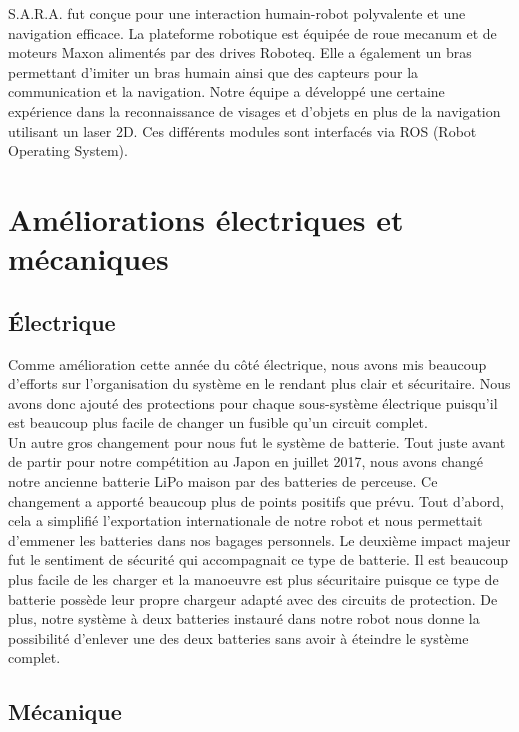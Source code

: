 \documentclass[runningheads,a4paper]{llncs}
\begin{document}
S.A.R.A. fut conçue pour une interaction humain-robot polyvalente et une navigation efficace. La plateforme robotique est équipée de roue mecanum et de moteurs Maxon alimentés par des drives Roboteq. Elle a également un bras permettant d'imiter un bras humain ainsi que des capteurs pour la communication et la navigation. Notre équipe a développé une certaine expérience dans la reconnaissance de visages et d'objets en plus de la navigation utilisant un laser 2D. Ces différents modules sont interfacés via ROS (Robot Operating System). \\

\section{Améliorations électriques et mécaniques}
\subsection{Électrique}

Comme amélioration cette année du côté électrique, nous avons mis beaucoup d'efforts sur l'organisation du système en le rendant plus clair et sécuritaire. Nous avons donc ajouté des protections pour chaque sous-système électrique puisqu'il est beaucoup plus facile de changer un fusible qu'un circuit complet. \\

Un autre gros changement pour nous fut le système de batterie. Tout juste avant de partir pour notre compétition au Japon en juillet 2017, nous avons changé notre ancienne batterie LiPo maison par des batteries de perceuse. Ce changement a apporté beaucoup plus de points positifs que prévu. Tout d'abord, cela a simplifié l'exportation internationale de notre robot et nous permettait d'emmener les batteries dans nos bagages personnels. Le deuxième impact majeur fut le sentiment de sécurité qui accompagnait ce type de batterie. Il est beaucoup plus facile de les charger et la manoeuvre est plus sécuritaire puisque ce type de batterie possède leur propre chargeur adapté avec des circuits de protection. De plus, notre système à deux batteries instauré dans notre robot nous donne la possibilité d'enlever une des deux batteries sans avoir à éteindre le système complet.\\



\subsection{Mécanique}
\end{document}
